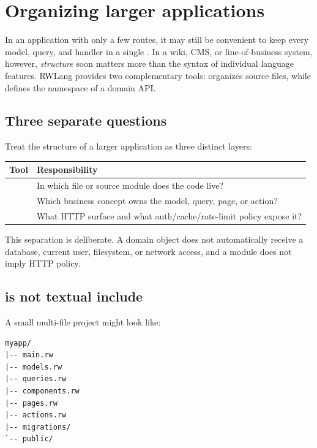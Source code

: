 \chapter{Organizing larger applications}

In an application with only a few routes, it may still be convenient to keep every model, query, and handler in a single . In a wiki, CMS, or line-of-business system, however, \emph{structure} soon matters more than the syntax of individual language features. RWLang provides two complementary tools:  organizes source files, while  defines the namespace of a domain API.

\section{Three separate questions}

Treat the structure of a larger application as three distinct layers:

\begin{center}
\begin{tabularx}{\textwidth}{@{}l Y@{}}
\toprule
\textbf{Tool} & \textbf{Responsibility} \\
\midrule
{} & In which file or source module does the code live? \\
 & Which business concept owns the model, query, page, or action? \\
 & What HTTP surface and what auth/cache/rate-limit policy expose it? \\
\bottomrule
\end{tabularx}
\end{center}

This separation is deliberate. A domain object does not automatically receive a database, current user, filesystem, or network access, and a module does not imply HTTP policy.

\section{ is not textual include}

A small multi-file project might look like:

\begin{lstlisting}
myapp/
|-- main.rw
|-- models.rw
|-- queries.rw
|-- components.rw
|-- pages.rw
|-- actions.rw
|-- migrations/
`-- public/
\end{lstlisting}


